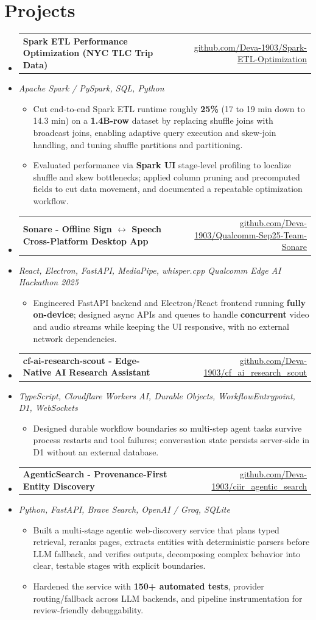 \documentclass[letterpaper,10pt]{article}
\makeatletter
\newcommand{\resumeItem}[1]{
  \item\small{#1\vspace{-1pt}}
}
\newcommand{\resumeProjectHeading}[2]{
    \item
    \begin{tabular*}{0.985\textwidth}[t]{l@{\extracolsep{\fill}}r}
      \small\textbf{#1} & \small #2 \\
    \end{tabular*}\vspace{-5pt}
}
\newcommand{\resumeProjectSubheading}[1]{
  \vspace{-2pt}\item[] {\small\textcolor{ResumeSlate}{\emph{#1}}}\vspace{-3pt}
}
\newcommand{\resumeSubHeadingListStart}{\begin{itemize}[leftmargin=0.0in, label={}, itemsep=2pt, topsep=2pt]}
\newcommand{\resumeSubHeadingListEnd}{\end{itemize}}
\newcommand{\resumeItemListStart}{\begin{itemize}[leftmargin=0.18in, itemsep=2pt, topsep=1pt]}
\newcommand{\resumeItemListEnd}{\end{itemize}\vspace{-4pt}}
\makeatother
\begin{document}
\section{Projects}
\resumeSubHeadingListStart
  \resumeProjectHeading
    {Spark ETL Performance Optimization (NYC TLC Trip Data)}
    {\href{https://github.com/Deva-1903/Spark-ETL-Optimization}{github.com/Deva-1903/Spark-ETL-Optimization}}
  \resumeProjectSubheading{Apache Spark / PySpark, SQL, Python}
    \resumeItemListStart
      \resumeItem{Cut end-to-end Spark ETL runtime roughly \textbf{25\%} (17 to 19 min down to 14.3 min) on a \textbf{1.4B-row} dataset by replacing shuffle joins with broadcast joins, enabling adaptive query execution and skew-join handling, and tuning shuffle partitions and partitioning.}
      \resumeItem{Evaluated performance via \textbf{Spark UI} stage-level profiling to localize shuffle and skew bottlenecks; applied column pruning and precomputed fields to cut data movement, and documented a repeatable optimization workflow.}
    \resumeItemListEnd
  \resumeProjectHeading
    {Sonare - Offline Sign \(\leftrightarrow\) Speech Cross-Platform Desktop App}
    {\href{https://github.com/Deva-1903/Qualcomm-Sep25-Team-Sonare}{github.com/Deva-1903/Qualcomm-Sep25-Team-Sonare}}
  \resumeProjectSubheading{React, Electron, FastAPI, MediaPipe, whisper.cpp \enspace\textbar\enspace Qualcomm Edge AI Hackathon 2025}
    \resumeItemListStart
      \resumeItem{Engineered FastAPI backend and Electron/React frontend running \textbf{fully on-device}; designed async APIs and queues to handle \textbf{concurrent} video and audio streams while keeping the UI responsive, with no external network dependencies.}
    \resumeItemListEnd
  \resumeProjectHeading
    {cf-ai-research-scout - Edge-Native AI Research Assistant}
    {\href{https://github.com/Deva-1903/cf_ai_research_scout}{github.com/Deva-1903/cf\_ai\_research\_scout}}
  \resumeProjectSubheading{TypeScript, Cloudflare Workers AI, Durable Objects, WorkflowEntrypoint, D1, WebSockets}
    \resumeItemListStart
      \resumeItem{Designed durable workflow boundaries so multi-step agent tasks survive process restarts and tool failures; conversation state persists server-side in D1 without an external database.}
    \resumeItemListEnd
  \resumeProjectHeading
    {AgenticSearch - Provenance-First Entity Discovery}
    {\href{https://github.com/Deva-1903/ciir_agentic_search}{github.com/Deva-1903/ciir\_agentic\_search}}
  \resumeProjectSubheading{Python, FastAPI, Brave Search, OpenAI / Groq, SQLite}
    \resumeItemListStart
      \resumeItem{Built a multi-stage agentic web-discovery service that plans typed retrieval, reranks pages, extracts entities with deterministic parsers before LLM fallback, and verifies outputs, decomposing complex behavior into clear, testable stages with explicit boundaries.}
      \resumeItem{Hardened the service with \textbf{150+ automated tests}, provider routing/fallback across LLM backends, and pipeline instrumentation for review-friendly debuggability.}
    \resumeItemListEnd
\resumeSubHeadingListEnd
\vspace{-4pt}
\end{document}
